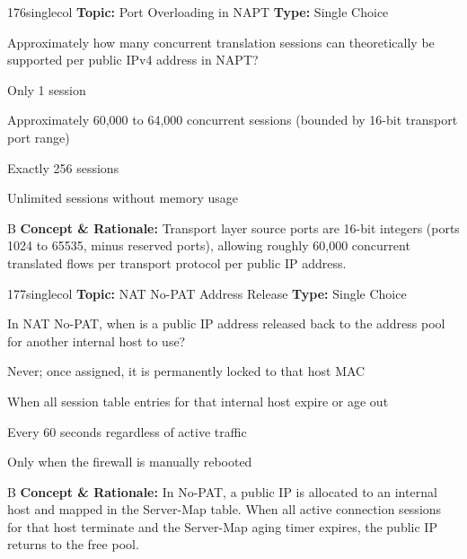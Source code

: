 \begin{qcard}{176}{singlecol}
\textcolor{darkslate!75}{\small\textbf{Topic:} Port Overloading in NAPT \hfill \textbf{Type:} Single Choice}\vspace{0.4em}\par
Approximately how many concurrent translation sessions can theoretically be supported per public IPv4 address in NAPT?
\begin{qoptions}
\item Only 1 session
\item Approximately 60,000 to 64,000 concurrent sessions (bounded by 16-bit transport port range)
\item Exactly 256 sessions
\item Unlimited sessions without memory usage
\end{qoptions}
\end{qcard}
\nopagebreak
\begin{explainbox}{B}
\textbf{Concept \& Rationale:} Transport layer source ports are 16-bit integers (ports 1024 to 65535, minus reserved ports), allowing roughly 60,000 concurrent translated flows per transport protocol per public IP address.
\end{explainbox}

\begin{qcard}{177}{singlecol}
\textcolor{darkslate!75}{\small\textbf{Topic:} NAT No-PAT Address Release \hfill \textbf{Type:} Single Choice}\vspace{0.4em}\par
In NAT No-PAT, when is a public IP address released back to the address pool for another internal host to use?
\begin{qoptions}
\item Never; once assigned, it is permanently locked to that host MAC
\item When all session table entries for that internal host expire or age out
\item Every 60 seconds regardless of active traffic
\item Only when the firewall is manually rebooted
\end{qoptions}
\end{qcard}
\nopagebreak
\begin{explainbox}{B}
\textbf{Concept \& Rationale:} In No-PAT, a public IP is allocated to an internal host and mapped in the Server-Map table. When all active connection sessions for that host terminate and the Server-Map aging timer expires, the public IP returns to the free pool.
\end{explainbox}

